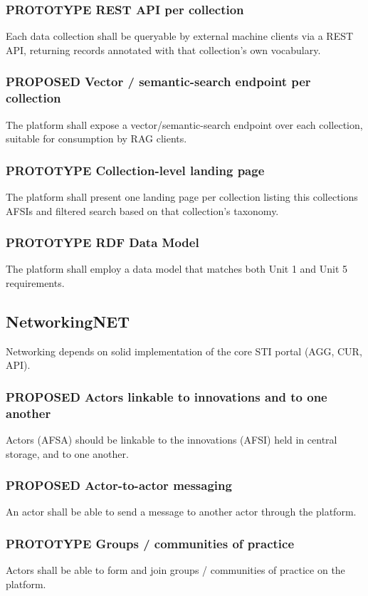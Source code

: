 \documentclass{scrartcl}
\begin{document}
\subsubsection{{\bfseries\sffamily PROTOTYPE} REST API per collection}
\label{sec:org9c0b5a3}
Each data collection shall be queryable by external machine clients via a REST API, returning records annotated with that collection's own vocabulary.
\subsubsection{{\bfseries\sffamily PROPOSED} Vector / semantic-search endpoint per collection}
\label{sec:org40a2aa2}
The platform shall expose a vector/semantic-search endpoint over each collection, suitable for consumption by RAG clients.
\subsubsection{{\bfseries\sffamily PROTOTYPE} Collection-level landing page}
\label{sec:orgd05d994}
The platform shall present one landing page per collection listing this collections AFSIs and filtered search based on that collection's taxonomy.
\subsubsection{{\bfseries\sffamily PROTOTYPE} RDF Data Model}
\label{sec:orge4ae598}
The platform shall employ a data model that matches both Unit 1 and Unit 5 requirements.
\subsection{Networking\hfill{}\textsc{NET}}
\label{sec:org4166fca}
Networking depends on solid implementation of the core STI portal (AGG, CUR, API).
\subsubsection{{\bfseries\sffamily PROPOSED} Actors linkable to innovations and to one another}
\label{sec:org4dc11d7}
Actors (AFSA) should be linkable to the innovations (AFSI) held in central storage, and to one another.
\subsubsection{{\bfseries\sffamily PROPOSED} Actor-to-actor messaging}
\label{sec:org842e6db}
An actor shall be able to send a message to another actor through the platform.
\subsubsection{{\bfseries\sffamily PROTOTYPE} Groups / communities of practice}
\label{sec:orgd39dd87}
Actors shall be able to form and join groups / communities of practice on the platform.
\end{document}
